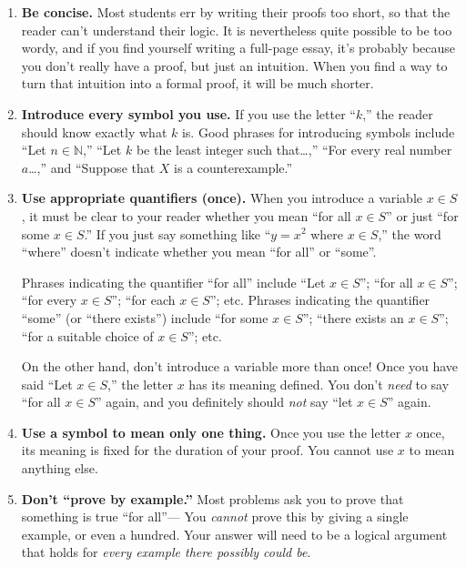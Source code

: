 \begin{enumerate}
\item \textbf{Be concise.}
	Most students err by writing their proofs too short,
	so that the reader can't understand their logic.
	It is nevertheless quite possible to be too wordy,
	and if you find yourself writing a full-page essay,
	it's probably because you don't really have a proof,
	but just an intuition.
	When you find a way to turn that intuition into a formal proof,
	it will be much shorter.

\item \textbf{Introduce every symbol you use.}
	If you use the letter ``$k$,'' the reader should know exactly what $k$ is.
	Good phrases for introducing symbols include
	  ``Let $n\in \mathbb{N}$,''
	  ``Let $k$ be the least integer such that\ldots,''
	  ``For every real number $a$\ldots,''
	  and
	  ``Suppose that $X$ is a counterexample.''
	  
\item \textbf{Use appropriate quantifiers (once).}
	When you introduce a variable $x\in S$, 
	it must be clear to your reader whether you mean ``for all $x\in S$''
	or just ``for some $x\in S$.''
	If you just say something like ``$y=x^2$ where $x\in S$,''
	the word ``where'' doesn't indicate whether you mean ``for all'' or ``some''.
	
	Phrases indicating the quantifier ``for all'' include 
	   ``Let $x\in S$'';
	   ``for all $x\in S$'';
	   ``for every $x\in S$'';
	   ``for each $x\in S$''; etc.
	Phrases indicating the quantifier ``some'' (or ``there exists'') include
	   ``for some $x\in S$'';
	   ``there exists an $x\in S$'';
	   ``for a suitable choice of $x\in S$''; etc.
	
	On the other hand, don't introduce a variable more than once!
	Once you have said ``Let $x\in S$,''
	the letter $x$ has its meaning defined.
	You don't \emph{need} to say ``for all $x\in S$'' again,
	and you definitely should \emph{not} say ``let $x\in S$'' again.

\item \textbf{Use a symbol to mean only one thing.}
	Once you use the letter $x$ once,
	its meaning is fixed for the duration of your proof.
	You cannot use $x$ to mean anything else.

\item \textbf{Don't ``prove by example.''}\label{pfbyexample}
	Most problems ask you to prove that something is true ``for all''---%
	You \emph{cannot} prove this by giving a single example, or even a hundred.
	Your answer will need to be a logical argument that holds for \emph{every example there possibly could be}.
	

\end{enumerate}
